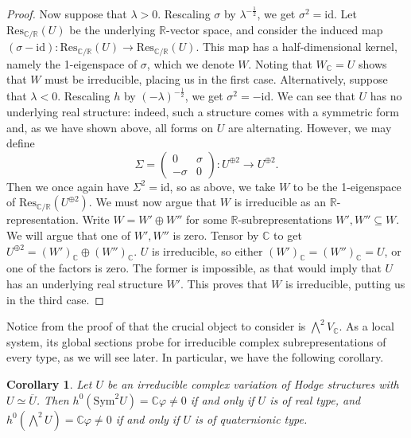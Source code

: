 \documentclass[12pt]{amsart}
\newcommand{\R}{\mathbb{R}}
\newcommand{\C}{\mathbb{C}}
\newtheorem{corollary}[theorem]{Corollary}
\theoremstyle{definition}
\theoremstyle{remark}
\numberwithin{equation}{section}
\begin{document}
\begin{proof}
Now suppose that $\lambda > 0$. Rescaling $\sigma$ by $\lambda^{-\frac{1}{2}}$, we get
$\sigma^2 = \mathrm{id}$. Let $\text{Res}_{\C/\R}(U)$ be the underlying
$\R$-vector space, and consider the induced map 
\((\sigma - \mathrm{id}): \text{Res}_{\C/\R}(U) \to \text{Res}_{\C/\R}(U)\).
This map has a half-dimensional kernel, namely the 1-eigenspace of \(\sigma\), which
we denote $W$. Noting that $W_\C = U$ shows that $W$ must be irreducible,
placing us in the first case. Alternatively, suppose that $\lambda < 0$.
Rescaling $h$ by $(-\lambda)^{-\frac{1}{2}}$,
we get $\sigma^2 = -\mathrm{id}$. We can see that $U$ has no underlying real structure:
indeed, such a structure comes with a symmetric form and, as we have shown above, all forms
on $U$ are alternating. However, we may define
\begin{equation}
    \Sigma = \begin{pmatrix}
        0 & \sigma \\
        -\sigma & 0
    \end{pmatrix}: U^{\oplus 2} \to U^{\oplus 2}.
\end{equation}
Then we once again have $\Sigma^2 = \textrm{id}$, so as above, we take $W$ to be the
1-eigenspace of $\text{Res}_{\C/\R}(U^{\oplus 2})$. We must now argue that $W$ is
irreducible as an $\R$-representation. Write \(W = W' \oplus W''\) for some 
\(\R\)-subrepresentations \(W', W'' \subseteq W\). We will argue that one of 
\(W', W''\) is zero. Tensor by \(\C\) to get \(U^{\oplus 2} = (W')_{\C} \oplus (W'')_{\C}\).
$U$ is irreducible, so either $(W')_\C = (W'')_\C = U$, or one of the factors
is zero. The former is impossible, as that would imply that $U$ has an underlying
real structure $W'$. This proves that $W$ is irreducible, putting us in the third case.
\end{proof}

Notice from  the proof of  that the crucial object to 
consider is \(\bigwedge^2 V_\C\). As a local system, its global sections probe for
irreducible complex subrepresentations of every type, as we will see later. 
In particular, we have the following corollary.

\begin{corollary}\label{proof-of-rep-classification}
    Let \(U\) be an irreducible complex variation of Hodge structures with 
    \(U \simeq \overline{U}\). Then \(h^0(\mathrm{Sym}^2 U) = \C\varphi \neq 0\) 
    if and only if \(U\) is of real type, and \(h^0(\bigwedge^2 U) = \C \varphi \neq 0\)
    if and only if \(U\) is of quaternionic type.
\end{corollary}
\end{document}
